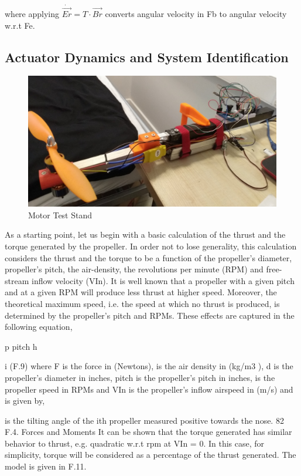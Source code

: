 \documentclass[12pt,a4paper,twoside]{report}
\begin{document}
					\\
					where applying \(\dot{\vec{Er}} = T \cdot \vec{Br} \) converts angular velocity in Fb to angular velocity w.r.t Fe.
					
					\newpage
			
			\subsection{Actuator Dynamics and System Identification}
				
				\begin{figure}[h!]
					\centering
					\includegraphics[width=0.8\linewidth]{TestStand1.jpg}
					\caption{Motor Test Stand}
					\label{fig:motorteststand}
				\end{figure}
				
				As a starting point, let us begin with a basic calculation of the thrust and the
				torque generated by the propeller. In order not to lose generality, this calculation considers the thrust and the torque to be a function of the propeller’s diameter, propeller’s pitch, the air-density, the revolutions per minute (RPM) and
				free-stream inflow velocity (VIn).
				It is well known that a propeller with a given pitch and at a given RPM will
				produce less thrust at higher speed. Moreover, the theoretical maximum speed,
				i.e. the speed at which no thrust is produced, is determined by the propeller’s
				pitch and RPMs. These effects are captured in the following equation,
		
				p
				pitch
				h
				
				i
				(F.9)
				where F is the force in (Newtons),  is the air density in (kg/m3
				), d is the propeller’s diameter in inches, pitch is the propeller’s pitch in inches,  is the propeller speed in RPMs and VIn is the propeller’s inflow airspeed in (m/s) and is
				given by,
			
				is the tilting angle of the ith propeller measured positive towards the nose.
				82 F.4. Forces and Moments
				It can be shown that the torque generated has similar behavior to thrust, e.g.
				quadratic w.r.t rpm at VIn = 0. In this case, for simplicity, torque will be considered
				as a percentage of the thrust generated. The model is given in F.11.
			
\end{document}
